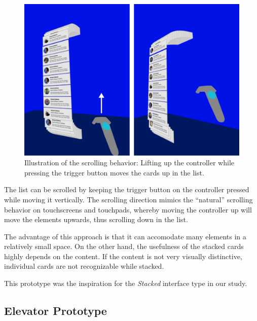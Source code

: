 \documentclass{tufte-book} %
\begin{document}
\begin{figure}
  \includegraphics{emailscroll.png}
  \caption{Illustration of the scrolling behavior: Lifting up the controller while pressing the trigger button moves the cards up in the list.}
  \label{fig:emailscroll}
\end{figure}

The list can be scrolled by keeping the trigger button on the controller pressed while moving it vertically. The scrolling direction mimics the ``natural'' scrolling behavior on touchscreens and touchpads, whereby moving the controller up will move the elements upwards, thus scrolling down in the list.

The advantage of this approach is that it can accomodate many elements in a relatively small space. On the other hand, the usefulness of the stacked cards highly depends on the content. If the content is not very visually distinctive, individual cards are not recognizable while stacked.

This prototype was the inspiration for the \emph{Stacked} interface type in our study.

\subsection{Elevator Prototype}
\end{document}

